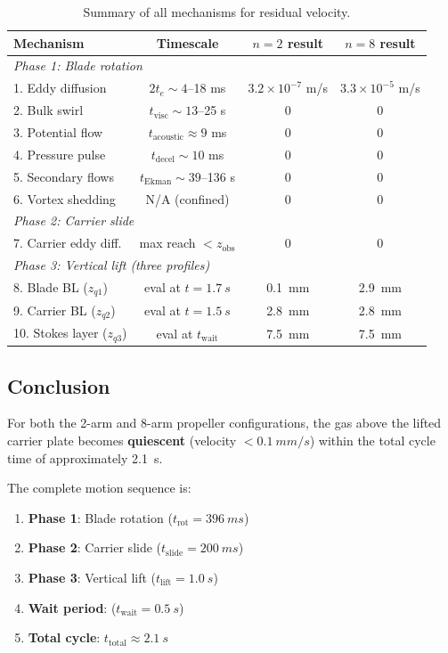 \documentclass[11pt,a4paper]{article}
\begin{document}
\begin{table}[H]
\centering
\caption{Summary of all mechanisms for residual velocity.}
\label{tab:summary}
\begin{tabular}{lccc}
\toprule
Mechanism & Timescale & $n = 2$ result & $n = 8$ result \\
\midrule
\multicolumn{4}{l}{\textit{Phase 1: Blade rotation}} \\
1. Eddy diffusion    & $2t_e \sim 4$--18 ms  & $3.2 \times 10^{-7}$ m/s & $3.3 \times 10^{-5}$ m/s \\
2. Bulk swirl        & $t_\mathrm{visc} \sim 13$--25 s & 0 & 0 \\
3. Potential flow    & $t_\mathrm{acoustic} \approx 9$ ms & 0 & 0 \\
4. Pressure pulse    & $t_\mathrm{decel} \sim 10$ ms & 0 & 0 \\
5. Secondary flows   & $t_\mathrm{Ekman} \sim 39$--136 s & 0 & 0 \\
6. Vortex shedding   & N/A (confined) & 0 & 0 \\
\midrule
\multicolumn{4}{l}{\textit{Phase 2: Carrier slide}} \\
7. Carrier eddy diff. & max reach $< z_\mathrm{obs}$ & 0 & 0 \\
\midrule
\multicolumn{4}{l}{\textit{Phase 3: Vertical lift (three profiles)}} \\
8. Blade BL ($z_{q1}$) & eval at $t = \SI{1.7}{s}$ & \SI{0.1}{mm} & \SI{2.9}{mm} \\
9. Carrier BL ($z_{q2}$) & eval at $t = \SI{1.5}{s}$ & \SI{2.8}{mm} & \SI{2.8}{mm} \\
10. Stokes layer ($z_{q3}$) & eval at $t_\mathrm{wait}$ & \SI{7.5}{mm} & \SI{7.5}{mm} \\
\bottomrule
\end{tabular}
\end{table}

\subsection{Conclusion}

For both the 2-arm and 8-arm propeller configurations, the gas above
the lifted carrier plate becomes \textbf{quiescent} (velocity $< \SI{0.1}{mm/s}$)
within the total cycle time of approximately \SI{2.1}{s}.

The complete motion sequence is:
\begin{enumerate}[nosep]
  \item \textbf{Phase 1}: Blade rotation ($t_\mathrm{rot} = \SI{396}{ms}$)
  \item \textbf{Phase 2}: Carrier slide ($t_\mathrm{slide} = \SI{200}{ms}$)
  \item \textbf{Phase 3}: Vertical lift ($t_\mathrm{lift} = \SI{1.0}{s}$)
  \item \textbf{Wait period}: ($t_\mathrm{wait} = \SI{0.5}{s}$)
  \item \textbf{Total cycle}: $t_\mathrm{total} \approx \SI{2.1}{s}$
\end{enumerate}
\end{document}
